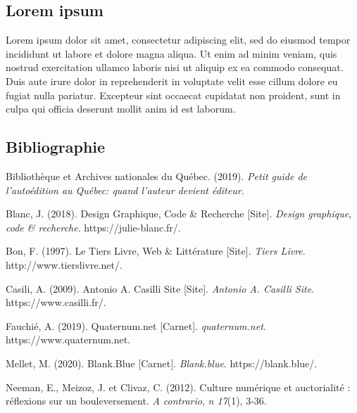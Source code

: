 \documentclass[10pt,french,letterpaper]{article}
\begin{document}
{\hypertarget{lorem-ipsum-2}{%
\subsection{Lorem ipsum}\label{lorem-ipsum-2}}

Lorem ipsum dolor sit amet, consectetur adipiscing elit, sed do eiusmod
tempor incididunt ut labore et dolore magna aliqua. Ut enim ad minim
veniam, quis nostrud exercitation ullamco laboris nisi ut aliquip ex ea
commodo consequat. Duis aute irure dolor in reprehenderit in voluptate
velit esse cillum dolore eu fugiat nulla pariatur. Excepteur sint
occaecat cupidatat non proident, sunt in culpa qui officia deserunt
mollit anim id est laborum.

\hypertarget{bibliographie}{%
\subsection*{Bibliographie}\label{bibliographie}}

\hypertarget{refs}{}
\leavevmode\hypertarget{ref-bibliotheque_et_archives_nationales_du_quebec_petit_2019}{}%
Bibliothèque et Archives nationales du Québec. (2019). \emph{Petit guide
de l'autoédition au Québec: quand l'auteur devient éditeur.}

\leavevmode\hypertarget{ref-blanc_design_2018}{}%
Blanc, J. (2018). Design Graphique, Code \& Recherche {[}Site{]}.
\emph{Design graphique, code \& recherche}. https://julie-blanc.fr/.

\leavevmode\hypertarget{ref-bon_tiers_1997}{}%
Bon, F. (1997). Le Tiers Livre, Web \& Littérature {[}Site{]}.
\emph{Tiers Livre}. http://www.tierslivre.net/.

\leavevmode\hypertarget{ref-casili_antonio_2009}{}%
Casili, A. (2009). Antonio A. Casilli Site {[}Site{]}. \emph{Antonio A.
Casilli Site}. https://www.casilli.fr/.

\leavevmode\hypertarget{ref-fauchie_quaternumnet_2019}{}%
Fauchié, A. (2019). Quaternum.net {[}Carnet{]}. \emph{quaternum.net}.
https://www.quaternum.net.

\leavevmode\hypertarget{ref-mellet_blankblue_2020}{}%
Mellet, M. (2020). Blank.Blue {[}Carnet{]}. \emph{Blank.blue}.
https://blank.blue/.

\leavevmode\hypertarget{ref-neeman_culture_2012}{}%
Neeman, E., Meizoz, J. et Clivaz, C. (2012). Culture numérique et
auctorialité : réflexions sur un bouleversement. \emph{A contrario},
\emph{n 17}(1), 3‑36.

}
\end{document}

